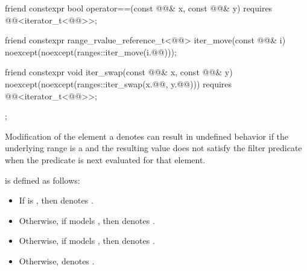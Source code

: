 \begin{codeblock}
{{    friend constexpr bool operator==(const @@& x, const @@& y)
      requires @@<iterator_t<@@>>;

    friend constexpr range_rvalue_reference_t<@@> iter_move(const @@& i)
      noexcept(noexcept(ranges::iter_move(i.@@)));

    friend constexpr void iter_swap(const @@& x, const @@& y)
      noexcept(noexcept(ranges::iter_swap(x.@@, y.@@)))
      requires @@<iterator_t<@@>>;
  };
}
\end{codeblock}

\pnum
\begin{note}
Modification of the element a  denotes
can result in undefined behavior
if the underlying range is a  and
the resulting value does not satisfy the filter predicate
when the predicate is next evaluated for that element.
\end{note}

\pnum
{} is defined as follows:
\begin{itemize}
\item If  is ,
then  denotes .

\item Otherwise, if  models , then
 denotes .

\item Otherwise, if  models , then
 denotes .

\item Otherwise,  denotes .
\end{itemize}

